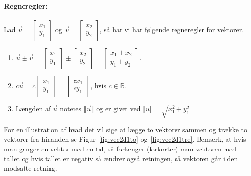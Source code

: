 \paragraph*{Regneregler:}
Lad $\vec{u} = \begin{bmatrix} x_1 \\ y_1 \end{bmatrix}$ og $\vec{v} = \begin{bmatrix} x_2 \\ y_2 \end{bmatrix}$, så har vi har følgende regneregler for vektorer.
\begin{enumerate}
\item $\displaystyle \vec{u} \pm \vec{v} = \begin{bmatrix} x_1 \\ y_1 \end{bmatrix} \pm \begin{bmatrix} x_2 \\ y_2 \end{bmatrix} = \begin{bmatrix} x_1 \pm x_2 \\ y_1 \pm y_2 \end{bmatrix} $.
\item $\displaystyle c \vec{u} = c  \begin{bmatrix} x_1 \\y_1 \end{bmatrix} = \begin{bmatrix} cx_1 \\ c y_1 \end{bmatrix}$, hvis $c \in \mathbb{R}$.
\item Længden af $\vec{u}$ noteres $\Vert \vec{u} \Vert$ og er givet ved $\displaystyle \Vert u \Vert = \sqrt{x_1^2+y_1^2}$
\end{enumerate}
For en illustration af hvad det vil sige at lægge to vektorer sammen og trække to vektorer fra hinanden se Figur~\ref{fig:vec2d1to} og~\ref{fig:vec2d1tre}. Bemærk, at hvis man ganger en vektor med en tal, så forlænger (forkorter) man vektoren med tallet og hvis tallet er negativ så ændrer også retningen, så vektoren går i den modsatte retning.
